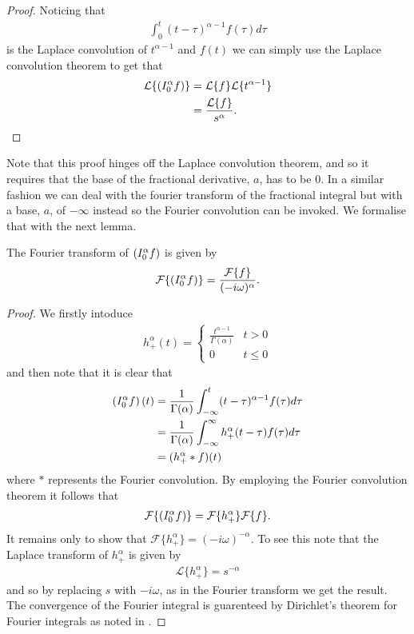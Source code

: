 \begin{proof}
    Noticing that 
    \begin{align}
        \int_0^t (t - \tau)^{\alpha - 1} f(\tau) d\tau 
    \end{align}
    is the Laplace convolution of $ t^{\alpha - 1} $ and $ f(t) $ we can simply use the Laplace convolution theorem
    to get that
    \begin{align}
        \mathcal{L}\{ \left( I_{0}^{\alpha} f \right) \} &= \mathcal{L}\{f\} \mathcal{L}\{ t^{\alpha - 1} \} \\
            &= \frac{\mathcal{L}\{f\}}{s^\alpha}.
    \end{align}
\end{proof}
Note that this proof hinges off the Laplace convolution theorem, and so it requires that the base of the fractional derivative, $ a $, has to be $ 0 $. In a similar fashion we can deal with the fourier transform of the fractional integral but with a base, $ a $, of $ -\infty $ instead so the Fourier convolution can be invoked. We formalise that with the next lemma.
\begin{lemma}
    \label{lem:rli_fourier}
    The Fourier transform of $ \left( I_{0}^{\alpha} f \right) $ is given by
    \begin{align}
        \mathcal{F}\{ \left( I_{0}^{\alpha} f \right) \} = \frac{\mathcal{F}\{f\}}{(-i\omega)^\alpha}.
    \end{align}
\end{lemma}
\begin{proof}
    We firstly intoduce
    \begin{align}
        h_+^\alpha(t) = \begin{cases}
            \frac{t^{\alpha-1}}{\Gamma(\alpha)} & t > 0 \\
            0   & t \leq 0
        \end{cases} 
    \end{align} and then note that it is clear that
    \begin{align}
        \left( I_{0}^{\alpha} f \right)(t) &= \frac{1}{\Gamma(\alpha)} \int_{-\infty}^t (t-\tau)^{\alpha-1} f(\tau)d\tau \\
            &= \frac{1}{\Gamma(\alpha)} \int_{-\infty}^\infty h_+^\alpha(t-\tau)f(\tau)d\tau \\
            &= (h_+^\alpha * f)(t)
    \end{align}
    where $ * $ represents the Fourier convolution.
    By employing the Fourier convolution theorem it follows that
    \begin{align}
         \mathcal{F}\{ \left( I_{0}^{\alpha} f \right) \} = \mathcal{F}\{ h_+^\alpha \}\mathcal{F}\{f\}.
    \end{align}
    It remains only to show that $ \mathcal{F}\{h_+^\alpha\} = (-i\omega)^{-\alpha} $. To see this note that the Laplace transform of $ h_+^\alpha $ is given by
    \begin{align}
        \mathcal{L}\{h_+^\alpha\} = s^{-\alpha} 
    \end{align}
    and so by replacing $ s $ with $ -i\omega $, as in the Fourier transform we get the result. The convergence of the Fourier integral is guarenteed by Dirichlet's theorem for Fourier integrals as noted in \cite{Podlubny1999}. 
\end{proof}
